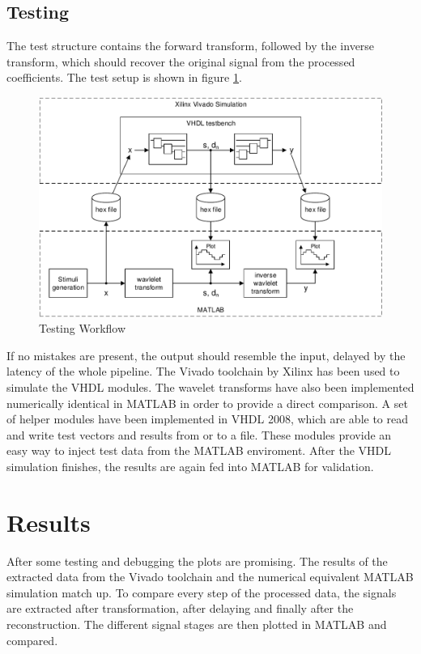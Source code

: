 \begin{refsection}
\subsection{Testing}

The test structure contains the forward transform, followed by the inverse transform, which should recover the original signal from the processed coefficients.
The test setup is shown in figure \ref{fpga:fig:testing}.
\begin{figure}
	\centering
	\includegraphics[width=\textwidth]{papers/fpga/images/vhdl_sim.pdf}
	\caption{Testing Workflow \label{fpga:fig:testing}}
\end{figure}
If no mistakes are present, the output should resemble the input, delayed by the latency of the whole pipeline.
The Vivado toolchain by Xilinx has been used to simulate the VHDL modules.
The wavelet transforms have also been implemented numerically identical in MATLAB in order to provide a direct comparison. 
A set of helper modules have been implemented in VHDL 2008, which are able to read and write test vectors and results from or to a file.
These modules provide an easy way to inject test data from the MATLAB enviroment.
After the VHDL simulation finishes, the results are again fed into MATLAB for validation.

\section{Results}

After some testing and debugging the plots are promising.
The results of the extracted data from the Vivado toolchain and the numerical equivalent MATLAB simulation match up.
To compare every step of the processed data, the signals are extracted after transformation, after delaying and finally after the reconstruction.
The different signal stages are then plotted in MATLAB and compared.


\end{refsection}
